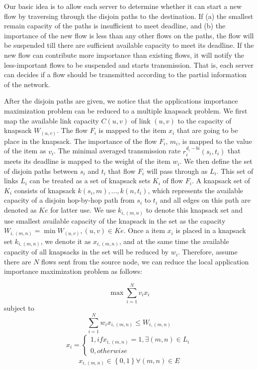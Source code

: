 \documentclass[conference]{IEEEtran}
\begin{document}
Our basic idea is to allow each server to determine whether it can start a new flow by traversing through the disjoin paths to the destination. If (a) the smallest remain capacity of the paths is insufficient to meet deadline, and (b) the importance of the new flow is less than any other flows on the paths, the flow will be suspended till there are sufficient available capacity to meet its deadline. If the new flow can contribute more importance than existing flows, it will notify the less-important flows to be suspended and starts transmission. That is, each server can decides if a flow should be transmitted according to the partial information of the network.

After the disjoin paths are given, we notice that the applications importance maximization problem can be reduced to a multiple knapsack problem. We first map the available link capacity $C(u,v)$ of link $(u,v)$ to the capacity of knapsack $W_{(u,v)}$. The flow $F_{i}$ is mapped to the item $x_{i}$ that are going to be place in the knapsack. The importance of the flow $F_{i}$, $m_{i}$, is mapped to the value of the item as $v_{i}$. The minimal averaged transmission rate $r_{i}^{d_{i}-b{i}}(s_{i},t_{i})$ that meets its deadline is mapped to the weight of the item $w_{i}$. We then define the set of disjoin paths between $s_{i}$ and $t_{i}$ that flow $F_{i}$ will pass through as $L_{i}$. This set of links $L_{i}$ can be treated as a set of knapsack sets $K_{i}$ of flow $F_{i}$. A knapsack set of $K_{i}$ consists of knapsack $k{(s_{i},m)},...,k{(n,t_{i})}$, which represents the available capacity of a disjoin hop-by-hop path from $s_{i}$ to $t_{i}$ and all edges on this path are denoted as $Ke$ for latter use. We use $k_{i,(m,n)}$ to denote this knapsack set and use smallest available capacity of the knapsack in the set as the capacity $W_{i,(m,n)} = \min W_{(u,v)}, (u,v)\in Ke$. Once a item $x_{i}$ is placed in a knapsack set $k_{i,(m,n)}$, we denote it as $x_{i,(m,n)}$, and at the same time the available capacity of all knapsacks in the set will be reduced by $w_{i}$. Therefore, assume there are $N$ flows sent from the source node, we can reduce the local application importance maximization problem as follows:

\begin{equation}
\max \sum_{i=1}^{N} v_{i}x_{i}
\label{eq:knapsack}
\end{equation}
subject  to
\begin{equation}
 \sum_{i=1}^{N} w_{i}x_{i,(m,n)} \leq W_{i,(m,n)}
 \label{eq:weightContraint}
\end{equation}
\begin{equation}
\begin{split}
x_{i} = \left\{\begin{matrix} 1, if x_{i,(m,n)} = 1, \exists (m,n) \in L_{i} \\
0, otherwise
\end{matrix}\right.
\end{split}
\label{eq:xi}
\end{equation}
\begin{equation}
x_{i,(m,n)} \in \left \{ 0,1 \right \} \forall (m,n) \in  E
\label{eq:x1}
\end{equation}
\end{document}
